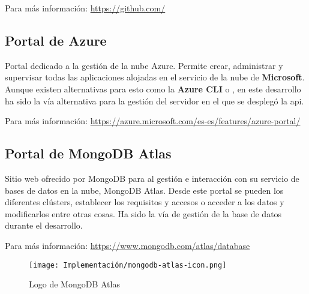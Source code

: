 Para más información: \href{https://github.com/}{https://github.com/}

\subsection{Portal de Azure}

Portal dedicado a la gestión de la nube Azure. Permite crear, administrar y supervisar todas las aplicaciones alojadas en el servicio de la nube de \textbf{Microsoft}. Aunque existen alternativas para esto como la \textbf{Azure CLI} o , en este desarrollo ha sido la vía alternativa para la gestión del servidor en el que se desplegó la \acrshort{api}.

Para más información: \href{https://azure.microsoft.com/es-es/features/azure-portal/}{https://azure.microsoft.com/es-es/features/azure-portal/}

\subsection{Portal de MongoDB Atlas}

Sitio web ofrecido por MongoDB para al gestión e interacción con su servicio de bases de datos en la nube, MongoDB Atlas. Desde este portal se pueden los diferentes clústers, establecer los requisitos y accesos o acceder a los datos y modificarlos entre otras cosas. Ha sido la vía de gestión de la base de datos durante el desarrollo.

Para más información: \href{https://www.mongodb.com/atlas/database}{https://www.mongodb.com/atlas/database}

\begin{figure}[H]
    \centering
    \texttt{[image: Implementación/mongodb-atlas-icon.png]}
    \caption{Logo de MongoDB Atlas}
\end{figure}